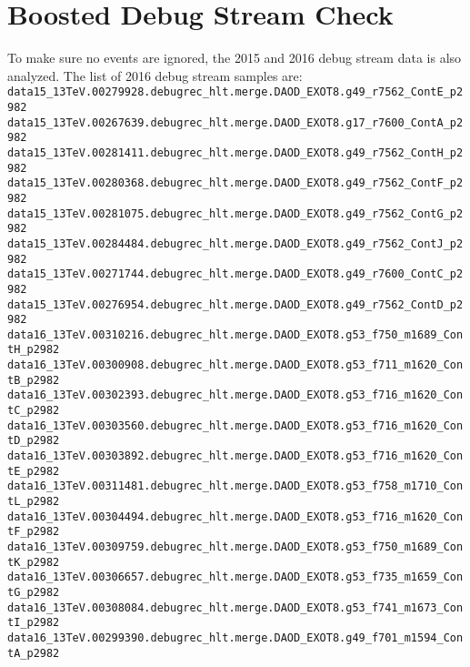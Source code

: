 \section{Boosted Debug Stream Check} %
\label{app:boosted-debug-stream}
To make sure no events are ignored, the 2015 and 2016 debug stream data is also analyzed. The list of 2016 debug stream samples are:
\noindent
\\
{\scriptsize
\verb|data15_13TeV.00279928.debugrec_hlt.merge.DAOD_EXOT8.g49_r7562_ContE_p2982|\\
\verb|data15_13TeV.00267639.debugrec_hlt.merge.DAOD_EXOT8.g17_r7600_ContA_p2982|\\
\verb|data15_13TeV.00281411.debugrec_hlt.merge.DAOD_EXOT8.g49_r7562_ContH_p2982|\\
\verb|data15_13TeV.00280368.debugrec_hlt.merge.DAOD_EXOT8.g49_r7562_ContF_p2982|\\
\verb|data15_13TeV.00281075.debugrec_hlt.merge.DAOD_EXOT8.g49_r7562_ContG_p2982|\\
\verb|data15_13TeV.00284484.debugrec_hlt.merge.DAOD_EXOT8.g49_r7562_ContJ_p2982|\\
\verb|data15_13TeV.00271744.debugrec_hlt.merge.DAOD_EXOT8.g49_r7600_ContC_p2982|\\
\verb|data15_13TeV.00276954.debugrec_hlt.merge.DAOD_EXOT8.g49_r7562_ContD_p2982|\\
\verb|data16_13TeV.00310216.debugrec_hlt.merge.DAOD_EXOT8.g53_f750_m1689_ContH_p2982|\\
\verb|data16_13TeV.00300908.debugrec_hlt.merge.DAOD_EXOT8.g53_f711_m1620_ContB_p2982|\\
\verb|data16_13TeV.00302393.debugrec_hlt.merge.DAOD_EXOT8.g53_f716_m1620_ContC_p2982|\\
\verb|data16_13TeV.00303560.debugrec_hlt.merge.DAOD_EXOT8.g53_f716_m1620_ContD_p2982|\\
\verb|data16_13TeV.00303892.debugrec_hlt.merge.DAOD_EXOT8.g53_f716_m1620_ContE_p2982|\\
\verb|data16_13TeV.00311481.debugrec_hlt.merge.DAOD_EXOT8.g53_f758_m1710_ContL_p2982|\\
\verb|data16_13TeV.00304494.debugrec_hlt.merge.DAOD_EXOT8.g53_f716_m1620_ContF_p2982|\\
\verb|data16_13TeV.00309759.debugrec_hlt.merge.DAOD_EXOT8.g53_f750_m1689_ContK_p2982|\\
\verb|data16_13TeV.00306657.debugrec_hlt.merge.DAOD_EXOT8.g53_f735_m1659_ContG_p2982|\\
\verb|data16_13TeV.00308084.debugrec_hlt.merge.DAOD_EXOT8.g53_f741_m1673_ContI_p2982|\\
\verb|data16_13TeV.00299390.debugrec_hlt.merge.DAOD_EXOT8.g49_f701_m1594_ContA_p2982|
}

